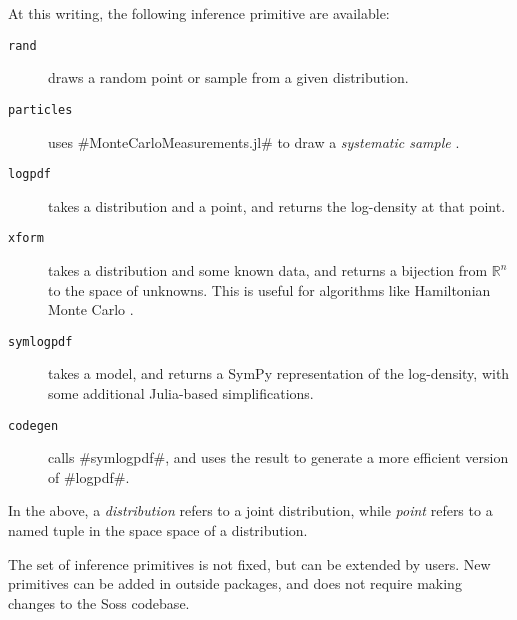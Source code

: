 \documentclass[anonymous=false, %
               format=acmsmall, %
               review=true, %
               screen=true, %
               nonacm=true]{acmart}
\begin{document}
At this writing, the following inference primitive are available:

\begin{description}  
    \item[\texttt{rand}] draws a random point or sample from a given distribution.
    \item[\texttt{particles}] uses \jl#MonteCarloMeasurements.jl# to draw a \emph{systematic sample} \cite{Douc2005}.
    \item[\texttt{logpdf}] takes a distribution and a point, and returns the log-density at that point.
    \item[\texttt{xform}] takes a distribution and some known data, and returns a bijection from $\mathbb{R}^n$ to the space of unknowns. This is useful for algorithms like Hamiltonian Monte Carlo \cite{Neal2011}.
    \item[\texttt{symlogpdf}] takes a model, and returns a SymPy \cite{10.7717/peerj-cs.103} representation of the log-density, with some additional Julia-based simplifications.
    \item[\texttt{codegen}] calls \jl#symlogpdf#, and uses the result to generate a more efficient version of \jl#logpdf#.
\end{description}

In the above, a \emph{distribution} refers to a joint distribution, while \emph{point} refers to a named tuple in the space space of a distribution.

The set of inference primitives is not fixed, but can be extended by users. New primitives can be added in outside packages, and does not require making changes to the Soss codebase. 
\end{document}
